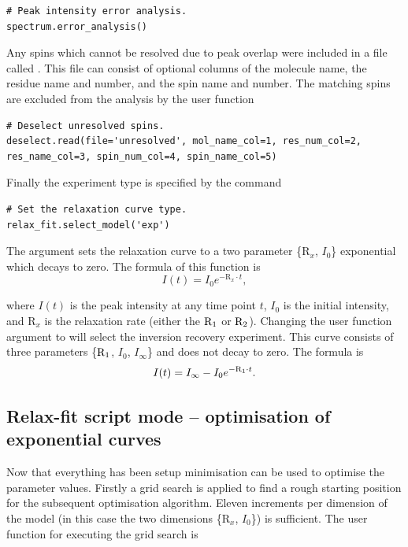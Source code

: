 \begin{lstlisting}[firstnumber=53]
# Peak intensity error analysis.
spectrum.error_analysis()
\end{lstlisting}

Any spins which cannot be resolved due to peak overlap were included in a file called .
This file can consist of optional columns of the molecule name, the residue name and number, and the spin name and number.
The matching spins are excluded from the analysis by the user function

\begin{lstlisting}[firstnumber=56]
# Deselect unresolved spins.
deselect.read(file='unresolved', mol_name_col=1, res_num_col=2, res_name_col=3, spin_num_col=4, spin_name_col=5)
\end{lstlisting}

Finally the experiment type is specified by the command

\begin{lstlisting}[firstnumber=59]
# Set the relaxation curve type.
relax_fit.select_model('exp')
\end{lstlisting}

The argument  sets the relaxation curve to a two parameter \{$\mathrm{R}_x$, $I_0$\} exponential which decays to zero.
The formula of this function is
\begin{equation}
 I(t) = I_0 e^{-\mathrm{R}_x \cdot t},
\end{equation}

\noindent where $I(t)$ is the peak intensity at any time point $t$, $I_0$ is the initial intensity, and $\mathrm{R}_x$ is the relaxation rate (either the $\mathrm{R}_1$ or $\mathrm{R}_2$).
Changing the user function argument to  will select the inversion recovery experiment.
This curve consists of three parameters \{$\mathrm{R}_1$, $I_0$, $I_{\infty}$\} and does not decay to zero.
The formula is
\begin{equation}
 I(t) = I_{\infty} - I_0 e^{-\mathrm{R}_1 \cdot t}.
\end{equation}




\subsection{Relax-fit script mode -- optimisation of exponential curves}

Now that everything has been setup minimisation can be used to optimise the parameter values.
Firstly a grid search is applied to find a rough starting position for the subsequent optimisation algorithm.
Eleven increments per dimension of the model (in this case the two dimensions \{$\mathrm{R}_x$, $I_0$\}) is sufficient.
The user function for executing the grid search is


